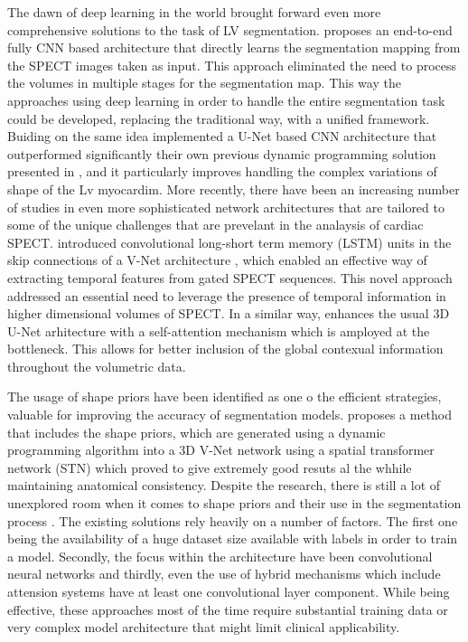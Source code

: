 The dawn of deep learning in the world brought forward even more comprehensive solutions to the task of LV segmentation. \cite{Wang2020} proposes an end-to-end fully CNN based architecture that directly learns the segmentation mapping from the SPECT images taken as input. This approach eliminated the need to process the volumes in multiple stages for the segmentation map. This way the approaches using deep learning in order to handle the entire segmentation task could be developed, replacing the traditional way, with a unified framework. Buiding on the same idea \cite{WEN2021166842} implemented a U-Net \cite{RFB15a} based CNN architecture that outperformed significantly their own previous dynamic programming solution presented in \cite{tang2017dynamic}, and it particularly improves handling the complex variations of shape of the Lv myocardim. More recently, there have been an increasing number of studies in even more sophisticated network architectures that are tailored to some of the unique challenges that are prevelant in the analaysis of cardiac SPECT. \cite{zhao2023spatial} introduced convolutional long-short term memory (LSTM) units in the skip connections of a V-Net architecture \cite{7785132}, which enabled an effective way of extracting temporal features from gated SPECT sequences. This novel approach addressed an essential need to leverage the presence of temporal information in higher dimensional volumes of SPECT. In a similar way, \cite{ZHANG2023107267} enhances the usual 3D U-Net arhitecture with a self-attention mechanism which is amployed at the bottleneck. This allows for better inclusion of the global contexual information throughout the volumetric data.

The usage of shape priors have been identified as one o the efficient strategies, valuable for improving the accuracy of segmentation models. \cite{ZHU2023106954} proposes a method that includes the shape priors, which are generated using a dynamic programming algorithm into a 3D V-Net network using a spatial transformer network (STN) which proved to give extremely good resuts al the whhile maintaining anatomical consistency. Despite the research, there is still a lot of unexplored room when it comes to shape priors and their use in the segmentation process \cite{Wang2020}. The existing solutions rely heavily on a number of factors. The first one being the availability of a huge dataset size available with labels in order to train a model. Secondly, the focus within the architecture have been convolutional neural networks and thirdly, even the use of hybrid mechanisms which include attension systems have at least one convolutional layer component. While being effective, these approaches most of the time require substantial training data or very complex model architecture that might limit clinical applicability.

